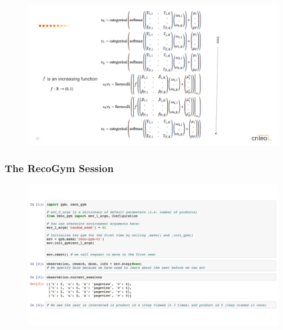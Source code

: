  \begin{frame}
  \frametitle{}
 
 
   \begin{figure}[h!]
     \includegraphics[scale=0.3]{images/recogymsim}
       \centering
       \label{motex1}
   \end{figure}
     
 \end{frame}



 \begin{frame}
  \frametitle{The RecoGym Session}
 
 
   \begin{figure}[h!]
     \includegraphics[scale=0.3]{images/reco_gym_sess0.png}
       \centering
       \label{motex1}
   \end{figure}
     
 \end{frame}



